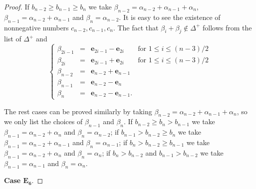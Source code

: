 \documentclass[12pt]{amsart}
\theoremstyle{definition}
\theoremstyle{remark}
\numberwithin{equation}{section}
\begin{document}
\begin{proof}
If $b_{n-2}\ge b_{n-1}\ge b_n$ we take
$\beta_{n-2} =  \alpha_{n-2}+\alpha_{n-1}+\alpha_n$,
 $\beta_{n-1}=\alpha_{n-2}+\alpha_{n-1}$ and $\beta_n=\alpha_{n-2}$.
It is easy to see the existence of nonnegative numbers $c_{n-2} ,c_{n-1}, c_n$.
The fact that 
$\beta_i+\beta_j\not \in \Delta^+$ follows from  the list of $\Delta^+$
and 
 \[
 \left\{
\begin{array}{lcll}
\beta_{2i-1} &=&  \mathbf e_{2i-1}- \mathbf e_{2i} &  \mbox{for }1\le i\le  (n-3)/2\\
\beta_{2i} &=&  \mathbf e_{2i-1}+ \mathbf e_{2i}               & \mbox{for }1\le i\le  (n-3)/2\\
\beta_{n-2}& = &  \mathbf e_{n-2}+ \mathbf e_{n-1} &  \\
\beta_{n-1}& = &  \mathbf e_{n-2}- \mathbf e_{n}  & \\
\beta_{n}& = &  \mathbf e_{n-2}- \mathbf e_{n-1}.  & 
\end{array}
\right.
\]

The rest cases can be proved similarly by taking 
$\beta_{n-2} =  \alpha_{n-2}+\alpha_{n-1}+\alpha_n$, so we only list the choices
 of $\beta_{n-1}$ and $\beta_n$.
If $b_{n-2}\ge b_{n}> b_{n-1}$ we take $\beta_{n-1}=\alpha_{n-2}+\alpha_{n}$ and $\beta_n=\alpha_{n-2}$;
if $b_{n-1}> b_{n-2}\ge b_n$ we take $\beta_{n-1}=\alpha_{n-2}+\alpha_{n-1}$ and $\beta_n=\alpha_{n-1}$;
if $b_{n}> b_{n-2}\ge b_{n-1}$ we  take $\beta_{n-1}=\alpha_{n-2}+\alpha_{n}$ and $\beta_n=\alpha_{n}$;
if $ b_{n}>b_{n-2}$ and
$ b_{n-1} >b_{n-2}$ we take $\beta_{n-1}=\alpha_{n-1}$ and $\beta_n=\alpha_{n}$.

 {\bf  Case $\mathbf {E_6}$}.


\end{proof}
\end{document}
